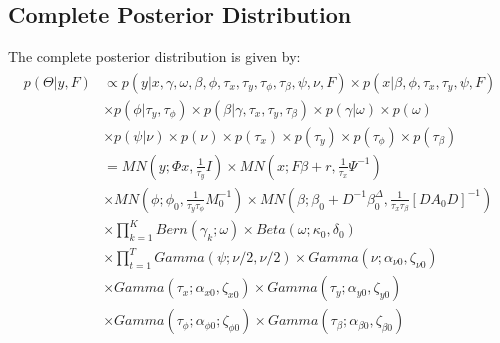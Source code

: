 \documentclass[11pt]{article}
\begin{document}
\subsection{Complete Posterior Distribution}
The complete posterior distribution is given by:
\begin{align}
\begin{split}
	p\left(\Theta|y,F\right) 	&\propto p\left(y|x,\gamma,\omega,\beta,\phi,\tau_{x},\tau_{y},\tau_{\phi},\tau_{\beta},\psi,\nu,F\right)\times p\left(x|\beta,\phi,\tau_{x},\tau_{y},\psi,F\right)\\
						&\times p\left(\phi|\tau_{y},\tau_{\phi}\right)\times p\left(\beta|\gamma,\tau_{x},\tau_{y},\tau_{\beta}\right)\times p\left(\gamma|\omega\right)\times p\left(\omega\right)\\
						&\times p\left(\psi|\nu\right)\times p\left(\nu\right)\times p\left(\tau_{x}\right)\times p\left(\tau_{y}\right)\times p\left(\tau_{\phi}\right)\times p\left(\tau_{\beta}\right)\\
						&=MN\left(y;\Phi x,\frac{1}{\tau_{y}}I\right)\times MN\left(x;F\beta+r,\frac{1}{\tau_{x}}\Psi^{-1}\right)\\
						&\times MN\left(\phi;\phi_{0},\frac{1}{\tau_{y}\tau_{\phi}}M_{0}^{-1}\right)\times MN\left(\beta;\beta_{0}+D^{-1}\beta_{0}^{\Delta},\frac{1}{\tau_{x}\tau_{\beta}}\left[DA_{0}D\right]^{-1}\right)\\
						&\times\prod_{k=1}^{K}Bern\left(\gamma_{k};\omega\right)\times Beta\left(\omega;\kappa_{0},\delta_{0}\right)\\
						&\times\prod_{t=1}^{T}Gamma\left(\psi;\nu/2,\nu/2\right)\times Gamma\left(\nu;\alpha_{\nu0},\zeta_{\nu0}\right)\\
						&\times Gamma\left(\tau_{x};\alpha_{x0},\zeta_{x0}\right)\times Gamma\left(\tau_{y};\alpha_{y0},\zeta_{y0}\right)\\
						&\times Gamma\left(\tau_{\phi};\alpha_{\phi0};\zeta_{\phi0}\right)\times Gamma\left(\tau_{\beta};\alpha_{\beta0},\zeta_{\beta0}\right)
\end{split}
\end{align}
\end{document}
